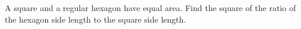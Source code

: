 A square and a regular hexagon have equal area. Find the square of the ratio of the hexagon side length to the square side length.
